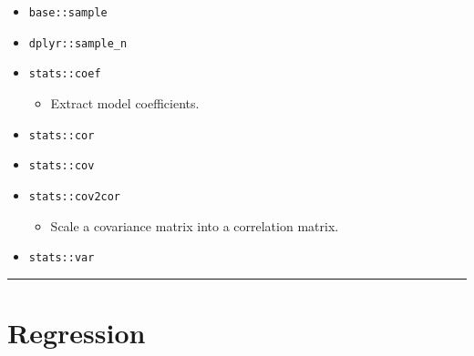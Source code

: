 \documentclass[
]{book}
\providecommand{\tightlist}{%
  \setlength{\itemsep}{0pt}\setlength{\parskip}{0pt}}
\begin{document}
\begin{itemize}
\tightlist
\item
  \texttt{base::sample}
\item
  \texttt{dplyr::sample\_n}
\item
  \texttt{stats::coef}

  \begin{itemize}
  \tightlist
  \item
    Extract model coefficients.
  \end{itemize}
\item
  \texttt{stats::cor}
\item
  \texttt{stats::cov}
\item
  \texttt{stats::cov2cor}

  \begin{itemize}
  \tightlist
  \item
    Scale a covariance matrix into a correlation matrix.
  \end{itemize}
\item
  \texttt{stats::var}
\end{itemize}

\begin{center}\rule{0.5\linewidth}{0.5pt}\end{center}

\hypertarget{regression}{%
\section{Regression}\label{regression}}
\end{document}
